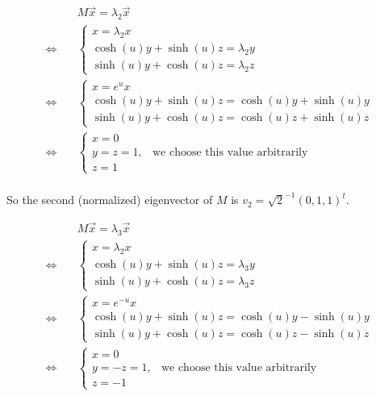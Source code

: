 \documentclass{article}
\begin{document}
\begin{align*}
    &M \Vec{x} = \lambda_2 \Vec{x} \\
    \Leftrightarrow \quad &\begin{cases}
        x = \lambda_2 x \\
        \cosh(u)y + \sinh(u)z = \lambda_2 y \\
        \sinh(u)y + \cosh(u)z = \lambda_2 z
    \end{cases} \\
    \Leftrightarrow \quad &\begin{cases}
        x = e^u x \\
        \cosh(u)y + \sinh(u)z = \cosh(u)y + \sinh(u)y \\
        \sinh(u)y + \cosh(u)z = \cosh(u)z + \sinh(u)z
    \end{cases} \\
    \Leftrightarrow \quad &\begin{cases}
        x = 0 \\
        y = z = 1, &\text{we choose this value arbitrarily} \\
        z = 1
    \end{cases} \\
\end{align*}

So the second (normalized) eigenvector of $M$ is $v_2 = \sqrt{2}^{-1}(0,1,1)^t$.

\begin{align*}
    &M \Vec{x} = \lambda_3 \Vec{x} \\
    \Leftrightarrow \quad &\begin{cases}
        x = \lambda_2 x \\
        \cosh(u)y + \sinh(u)z = \lambda_3 y \\
        \sinh(u)y + \cosh(u)z = \lambda_3 z
    \end{cases} \\
    \Leftrightarrow \quad &\begin{cases}
        x = e^{-u} x \\
        \cosh(u)y + \sinh(u)z = \cosh(u)y - \sinh(u)y \\
        \sinh(u)y + \cosh(u)z = \cosh(u)z - \sinh(u)z
    \end{cases} \\
    \Leftrightarrow \quad &\begin{cases}
        x = 0 \\
        y = -z = 1, &\text{we choose this value arbitrarily} \\
        z = -1
    \end{cases} \\
\end{align*}
\end{document}
